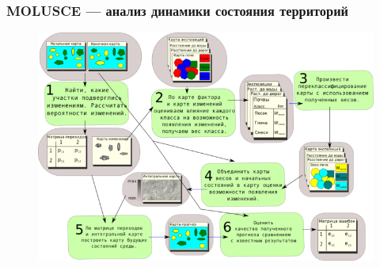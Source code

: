 \begin{frame}
    \frametitle{MOLUSCE --- анализ динамики состояния территорий}
    \begin{figure}[!ht]
        \begin{center}
            \includegraphics[width=0.9\columnwidth]{./introduction/img/MOLUSCE}
        \end{center}
    \end{figure}
\end{frame}

